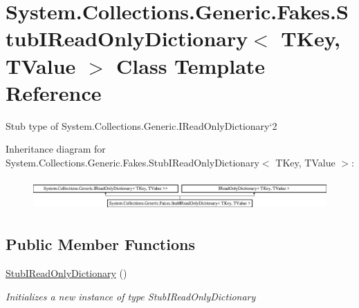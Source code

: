 \hypertarget{class_system_1_1_collections_1_1_generic_1_1_fakes_1_1_stub_i_read_only_dictionary_3_01_t_key_00_01_t_value_01_4}{\section{System.\-Collections.\-Generic.\-Fakes.\-Stub\-I\-Read\-Only\-Dictionary$<$ T\-Key, T\-Value $>$ Class Template Reference}
\label{class_system_1_1_collections_1_1_generic_1_1_fakes_1_1_stub_i_read_only_dictionary_3_01_t_key_00_01_t_value_01_4}
}


Stub type of System.\-Collections.\-Generic.\-I\-Read\-Only\-Dictionary`2 


Inheritance diagram for System.\-Collections.\-Generic.\-Fakes.\-Stub\-I\-Read\-Only\-Dictionary$<$ T\-Key, T\-Value $>$\-:\begin{figure}[H]
\begin{center}
\leavevmode
\includegraphics[height=1.214751cm]{class_system_1_1_collections_1_1_generic_1_1_fakes_1_1_stub_i_read_only_dictionary_3_01_t_key_00_01_t_value_01_4}
\end{center}
\end{figure}
\subsection*{Public Member Functions}
\begin{DoxyCompactItemize}
\item 
\hyperlink{class_system_1_1_collections_1_1_generic_1_1_fakes_1_1_stub_i_read_only_dictionary_3_01_t_key_00_01_t_value_01_4_a2dc6d5de4e8e2e8a462d91d45f90a07e}{Stub\-I\-Read\-Only\-Dictionary} ()
\begin{DoxyCompactList}\small\item\em Initializes a new instance of type Stub\-I\-Read\-Only\-Dictionary\end{DoxyCompactList}\end{DoxyCompactItemize}
